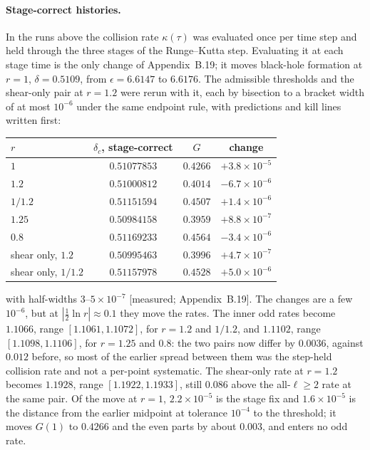 \documentclass[11pt]{article}
\newcommand{\grade}[1]{\textsf{\small[#1]}}
\begin{document}
\paragraph{Stage-correct histories.} In the runs above the collision rate $\kappa(\tau)$ was evaluated once per time step and held through the three stages of the Runge--Kutta step. Evaluating it at each stage time is the only change of Appendix~B.19; it moves black-hole formation at $r=1$, $\delta=0.5109$, from $\epsilon=6.6147$ to $6.6176$. The admissible thresholds and the shear-only pair at $r=1.2$ were rerun with it, each by bisection to a bracket width of at most $10^{-6}$ under the same endpoint rule, with predictions and kill lines written first:
\begin{center}\small\begin{tabular}{lccc}\toprule
$r$ & $\delta_c$, stage-correct & $G$ & change\\\midrule
$1$ & $0.51077853$ & $0.4266$ & $+3.8\times10^{-5}$\\
$1.2$ & $0.51000812$ & $0.4014$ & $-6.7\times10^{-6}$\\
$1/1.2$ & $0.51151594$ & $0.4507$ & $+1.4\times10^{-6}$\\
$1.25$ & $0.50984158$ & $0.3959$ & $+8.8\times10^{-7}$\\
$0.8$ & $0.51169233$ & $0.4564$ & $-3.4\times10^{-6}$\\
shear only, $1.2$ & $0.50995463$ & $0.3996$ & $+4.7\times10^{-7}$\\
shear only, $1/1.2$ & $0.51157978$ & $0.4528$ & $+5.0\times10^{-6}$\\\bottomrule\end{tabular}\end{center}
with half-widths $3$--$5\times10^{-7}$ \grade{measured; Appendix~B.19}. The changes are a few $10^{-6}$, but at $|\tfrac12\ln r|\approx0.1$ they move the rates. The inner odd rates become $1.1066$, range $[1.1061,1.1072]$, for $r=1.2$ and $1/1.2$, and $1.1102$, range $[1.1098,1.1106]$, for $r=1.25$ and $0.8$: the two pairs now differ by $0.0036$, against $0.012$ before, so most of the earlier spread between them was the step-held collision rate and not a per-point systematic. The shear-only rate at $r=1.2$ becomes $1.1928$, range $[1.1922,1.1933]$, still $0.086$ above the all-$\ell\ge2$ rate at the same pair. Of the move at $r=1$, $2.2\times10^{-5}$ is the stage fix and $1.6\times10^{-5}$ is the distance from the earlier midpoint at tolerance $10^{-4}$ to the threshold; it moves $G(1)$ to $0.4266$ and the even parts by about $0.003$, and enters no odd rate.
\end{document}
